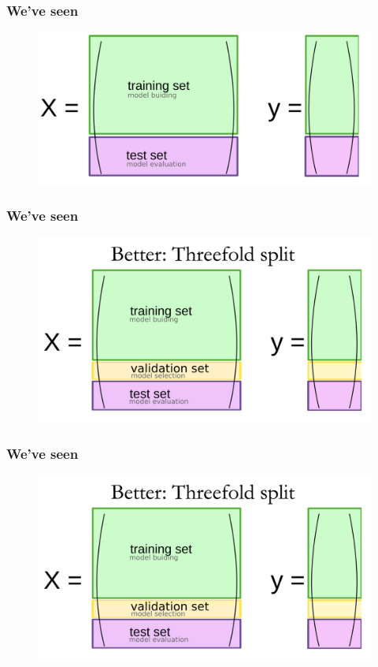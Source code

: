 \documentclass[compress, aspectratio=54]{beamer}
\begin{document}
\begin{frame}
\frametitle{We've seen }
\begin{figure}

\includegraphics[width=0.9\linewidth ]{Figures/train-test-split.png}
\end{figure}

\end{frame}


\begin{frame}
\frametitle{We've seen}
\begin{figure}
\includegraphics[width=0.9\linewidth ]{Figures/threefold-split.png}
\end{figure}
\end{frame}

\begin{frame}
\frametitle{We've seen}
\begin{figure}
\includegraphics[width=0.9\linewidth ]{Figures/threefold-split.png}
\end{figure}
\end{frame}
\end{document}
